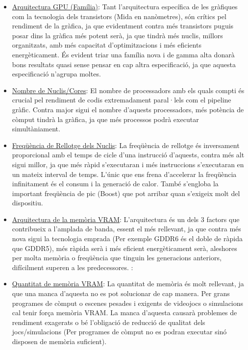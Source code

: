 \documentclass[12pt]{article}
\begin{document}
\begin{itemize}

    \item \underline{Arquitectura GPU (Família)}: Tant l'arquitectura específica de les gràfiques com la tecnologia dels transistors (Mida en nanòmetres), són crítics pel rendiment de la gràfica, ja que evidentment contra més transistors puguis posar dins la gràfica més potent serà, ja que tindrà més nuclis, millors organitzats, amb més capacitat d'optimitzacions i més eficients energèticament. És evident triar una família nova i de gamma alta donarà bons resultats quasi sense pensar en cap altra especificació, ja que aquesta especificació n'agrupa moltes.
    
	\item  \underline{Nombre de Nuclis/Cores}: El nombre de processadors amb els quals compti és crucial pel rendiment de codis extremadament paral·lels com el pipeline gràfic. Contra major sigui el nombre d'aquests processadors, més potència de còmput tindrà la gràfica, ja que més processos podrà executar simultàniament.

    \item \underline{Freqüència de Rellotge dels Nuclis}:  La freqüència de rellotge és inversament proporcional amb el temps de cicle d'una instrucció d'aquests, contra més alt sigui millor, ja que més ràpid s'executaran i més instruccions s'executaran en un mateix interval de temps. L'únic que ens frena d'accelerar la freqüència infinitament és el consum i la generació de calor. També s'engloba la important freqüència de pic (Boost) que pot arribar quan s'exigeix molt del dispositiu.


    \item \underline{Arquitectura de la memòria VRAM}: L'arquitectura és un dels 3 factors que contribueix a l'amplada de banda, essent el més rellevant, ja que contra més nova sigui la tecnologia emprada (Per exemple GDDR6 és el doble de ràpida que GDDR5), més ràpida serà i més eficient energèticament serà, aleshores per molta memòria o freqüència que tinguin les generacions anteriors, difícilment superen a les predecessores.
:

    \item \underline{Quantitat de memòria VRAM}: La quantitat de memòria és molt rellevant, ja que una manca d'aquesta no es pot solucionar de cap manera. Per grans programes de còmput o escenes pesades i exigents de videojocs o simulacions cal tenir força memòria VRAM. La manca d'aquesta causarà problemes de rendiment exagerats o bé l'obligació de reducció de qualitat dels jocs/simulacions (Per programes de còmput no es podran executar sinó disposen de memòria suficient).


\end{itemize}
\end{document}
